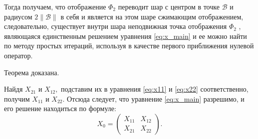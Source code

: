 \begin{enumerate}
Тогда получаем, что отображение $\Phi_2$ переводит шар с центром в точке $\mathcal{B}$ и радиусом $2\|\mathcal{B}\|$ в себя и является на этом шаре сжимающим отображением, следовательно, существует внутри шара неподвижная точка отображения $\Phi_2$ , являющаяся единственным решением уравнения \eqref{eq:x_main} и ее можно найти по методу простых итераций, используя в качестве первого приближения нулевой оператор.   
\end{enumerate}
Теорема доказана.
\hfill

Найдя $X_{21}$ и $X_{12},$ подставим их в уравнения \eqref{eq:x11} и \eqref{eq:x22} соответственно, получим $X_{11}$ и $X_{22}.$ Отсюда следует, что уравнение \eqref{eq:x_main} разрешимо, и его решение находиться по формуле:
$$
	X_0 = \begin{pmatrix}
		X_{11} & X_{12} \\
		X_{21} & X_{22}
	\end{pmatrix}.
$$ 
